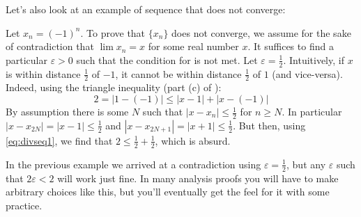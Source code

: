 \documentclass[../notes.tex]{subfiles}
\begin{document}
Let's also look at an example of sequence that does not converge:

\begin{example}
    Let $x_n=(-1)^n$. To prove that $\{x_n\}$ does not converge, we assume for the sake of contradiction that $\lim x_n=x$ for some real number $x$. It suffices to find a particular $\varepsilon>0$ such that the condition for  is not met. 
    Let $\varepsilon=\frac{1}{2}$. Intuitively, if $x$ is within distance $\frac{1}{2}$ of $-1$, it cannot be within distance $\frac{1}{2}$ of $1$ (and vice-versa). Indeed, using the triangle inequality (part (c) of ):
    \begin{equation*}\label{eq:divseq1}
        2=|1-(-1)| \leq |x-1|+|x-(-1)| 
    \end{equation*}
    By assumption there is some $N$ such that $|x-x_n|\leq \frac{1}{2}$ for  $n\geq N$. In particular $|x-x_{2N}| = |x-1|\leq \frac{1}{2}$ and $|x-x_{2N+1}|=|x+1|\leq \frac{1}{2}$. But then, using \eqref{eq:divseq1}, we find that $2\leq \frac{1}{2}+\frac{1}{2}$, which is absurd. 
\end{example}

In the previous example we arrived at a contradiction using $\varepsilon=\frac{1}{2}$, but any $\varepsilon$ such that $2\varepsilon < 2$ will work just fine. In many analysis proofs you will have to make arbitrary choices like this, but you'll eventually get the feel for it with some practice. 
\end{document}
